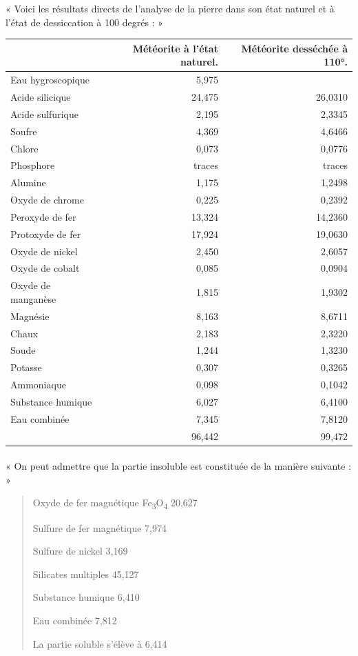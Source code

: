 \documentclass[a4paper, 11pt, oneside, polutonikogreek, french]{article}
\begin{document}
« Voici les résultats directs de l'analyse de la pierre dans son état naturel et à l'état de dessiccation à 100 degrés : »
\begin{table}[H]
    \centering\small
    \begin{tabular}{|l|r|r|}
    \hline
        ~ & Météorite à l'état naturel. & Météorite desséchée à 110°.   \\ \hline
        Eau hygroscopique & 5,975 & ~ \\ \hline
        Acide silicique & 24,475 & 26,0310   \\ \hline
        Acide sulfurique & 2,195 & 2,3345   \\ \hline
        Soufre & 4,369 & 4,6466   \\ \hline
        Chlore & 0,073 & 0,0776   \\ \hline
        Phosphore & traces & traces   \\ \hline
        Alumine & 1,175 & 1,2498   \\ \hline
        Oxyde de chrome & 0,225 & 0,2392   \\ \hline
        Peroxyde de fer & 13,324 & 14,2360   \\ \hline
        Protoxyde de fer & 17,924 & 19,0630   \\ \hline
        Oxyde de nickel & 2,450 & 2,6057   \\ \hline
        Oxyde de cobalt & 0,085 & 0,0904   \\ \hline
        Oxyde de manganèse & 1,815 & 1,9302   \\ \hline
        Magnésie & 8,163 & 8,6711   \\ \hline
        Chaux & 2,183 & 2,3220   \\ \hline
        Soude & 1,244 & 1,3230   \\ \hline
        Potasse & 0,307 & 0,3265   \\ \hline
        Ammoniaque & 0,098 & 0,1042   \\ \hline
        Substance humique & 6,027 & 6,4100   \\ \hline
        Eau combinée & 7,345 & 7,8120   \\ \hline
        ~ & 96,442 & 99,472 \\ \hline
    \end{tabular}
\end{table}
\paragraph{}
« On peut admettre que la partie insoluble est constituée de la manière suivante : »
\begin{quotation}
Oxyde de fer magnétique Fe\textsubscript{3}O\textsubscript{4} 20,627

Sulfure de fer magnétique 7,974

Sulfure de nickel 3,169

Silicates multiples 45,127

Substance humique 6,410

Eau combinée 7,812

La partie soluble s'élève à 6,414
\end{quotation}
\end{document}
